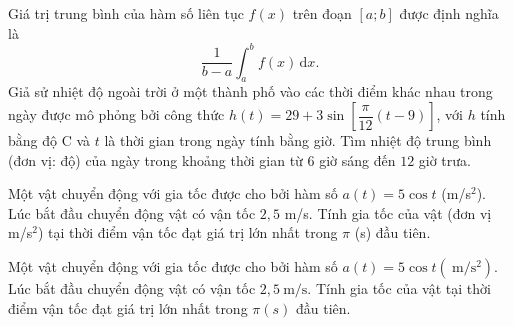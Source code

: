 \begin{ex}%
Giá trị trung bình của hàm số liên tục $f(x)$ trên đoạn $[a ; b]$ được định nghĩa là
\[
\dfrac{1}{b-a} \int_a^b f(x) \mathrm{\,d}x .
\]
Giả sử nhiệt độ ngoài trời ở một thành phố vào các thời điểm khác nhau trong ngày được mô phỏng bởi công thức $	h(t)=29+3 \sin \left[\dfrac{\pi}{12}(t-9)\right]$, với $h$ tính bằng độ $\mathrm{C}$ và $t$ là thời gian trong ngày tính bằng giờ.	Tìm nhiệt độ trung bình (đơn vị: độ) của ngày trong khoảng thời gian từ $6$ giờ sáng đến $12$ giờ trưa.
\end{ex}

\begin{ex}%
Một vật chuyển động với gia tốc được cho bởi hàm số $a(t)=5\cos t$ (m/s$^2$). Lúc bắt đầu chuyển động vật có vận tốc $2{,}5$ m/s. Tính gia tốc của vật (đơn vị m/s$^2$) tại thời điểm vận tốc đạt giá trị lớn nhất trong $\pi$ (s) đầu tiên.
\end{ex}

\begin{ex}%
Một vật chuyển động với gia tốc được cho bởi hàm số $a(t)=5 \cos t\left(\mathrm{~m} / \mathrm{s}^2\right)$. Lúc bắt đầu chuyển động vật có vận tốc $2,5 \mathrm{~m} / \mathrm{s}$. Tính gia tốc của vật tại thời điểm vận tốc đạt giá trị lớn nhất trong $\pi(s)$ đầu tiên.
\end{ex}

